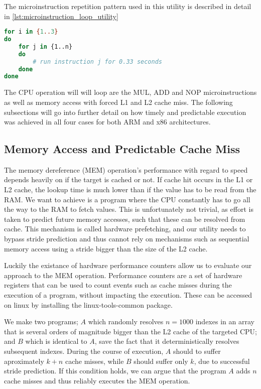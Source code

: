 The microinstruction repetition pattern used in this utility is described in detail in \autoref{lst:microinstruction_loop_utility}

\begin{lstlisting}[language=BASH, caption={Mapping execution to the time domain: Microinstruction loop utility.}, label={lst:microinstruction_loop_utility}]
for i in {1..3}
do
	for j in {1..n}
	do
		# run instruction j for 0.33 seconds
	done
done
\end{lstlisting}

The CPU operation will will loop are the MUL, ADD and NOP microinstructions as well as memory access with forced L1 and L2 cache miss. 
The following subsections will go into further detail on how timely and predictable execution was achieved in all four cases for both ARM and x86 architectures.

\subsection{Memory Access and Predictable Cache Miss}

The memory dereference (MEM) operation's performance with regard to speed depends heavily on if the target is cached or not. 
If cache hit occurs in the L1 or L2 cache, the lookup time is much lower than if the value has to be read from the RAM.
We want to achieve is a program where the CPU constantly has to go all the way to the RAM to fetch values.
This is unfortunately not trivial, as effort is taken to predict future memory accesses, such that these can be resolved from cache.
This mechanism is called hardware prefetching, and our utility needs to bypass stride prediction and thus cannot rely on mechanisms such as sequential memory access using a stride bigger than the size of the L2 cache.

Luckily the existance of hardware performance counters allow us to evaluate our approach to the MEM operation. Performance counters are a set of hardware registers that can be used to count events such as cache misses during the execution of a program, without impacting the execution. These can be accessed on linux by installing the linux-tools-common package.

We make two programs; \(A\) which randomly resolves \(n = 1000\) indexes in an array that is several orders of magnitude bigger than the L2 cache of the targeted CPU; and \(B\) which is identical to \(A\), save the fact that it deterministically resolves subsequent indexes.
During the course of execution, \(A\) should to suffer aproximately \(k+n\) cache misses, while \(B\) should suffer only \(k\), due to successful stride prediction. 
If this condition holds, we can argue that the program \(A\) adds \(n\) cache misses and thus reliably executes the MEM operation. 

